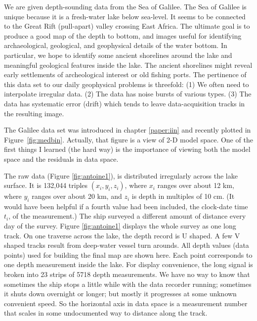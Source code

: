 We are given depth-sounding data from the Sea of 
Galilee.  The Sea of Galilee is unique
because it is a fresh-water lake below sea-level.
It seems to be connected to the Great Rift (pull-apart)
valley crossing East Africa. The ultimate goal is to produce a good map of
the depth to bottom, and images useful for identifying archaeological,
geological, and geophysical details of the water bottom. In particular,
we hope to identify some ancient shorelines around the lake and meaningful 
geological features inside the lake. The ancient shorelines might
reveal early settlements of archeological interest or old fishing ports.
The pertinence of this data set to our daily geophysical problems is threefold:
(1) We often need to interpolate irregular data.
(2) The data has noise bursts of various types.
(3) The data has systematic error (drift)
which tends to leave data-acquisition tracks in the resulting image.

\par
The Galilee data set was introduced in chapter \ref{paper:iin}
and recently plotted in Figure~\ref{fig:medbin}.
Actually, that figure is a view of 2-D model space.
One of the first things I learned (the hard way) is the importance
of viewing both the model space and the residuals in data space.
\par
{}

\par
The raw data (Figure \ref{fig:antoine1}),
is distributed irregularly across the lake surface.
It is 132,044 triples $(x_i,y_i,z_i)$, where $x_i$ ranges over about 
12 km, where $y_i$ ranges over about 20 km,
and $z_i$ is depth in multiples of 10 cm.
(It would have been helpful if a fourth value had been included,
the clock-date time $t_i$, of the measurement.)
The ship surveyed a different amount of distance every day of the survey.
Figure \ref{fig:antoine1} displays the whole survey as one long track.
On one traverse across the lake, the depth record is U shaped.
A few V shaped tracks result from deep-water vessel turn arounds.
All depth values (data points) used for building the final map are shown here.
Each point corresponds to one depth measurement inside the lake.
For display convenience, the long signal is broken
into 23 strips of 5718 depth measurements.
We have no way to know that sometimes the ship stops a little while
with the data recorder running;
sometimes it shuts down overnight or longer;
but mostly it progresses at some unknown convenient speed.
So the horizontal axis in data space is a measurement number
that scales in some undocumented way to distance along the track.

